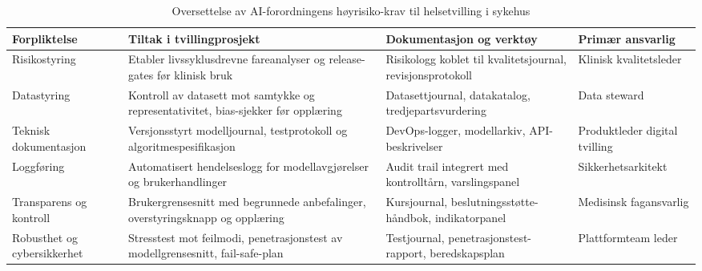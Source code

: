 \begin{table}[ht]
    \centering
    \caption{Oversettelse av AI-forordningens høyrisiko-krav til helsetvilling i sykehus}
    \label{tab:ai-helsekrav}
    \begin{tabular}{|p{3.4cm}|p{4.6cm}|p{4.6cm}|p{3.0cm}|}
        \hline
        \textbf{Forpliktelse} & \textbf{Tiltak i tvillingprosjekt} & \textbf{Dokumentasjon og verktøy} & \textbf{Primær ansvarlig} \\
        \hline
        Risikostyring & Etabler livssyklusdrevne fareanalyser og release-gates før klinisk bruk & Risikologg koblet til kvalitetsjournal, revisjonsprotokoll \citep{dnv2023digitalassurance} & Klinisk kvalitetsleder \\
        \hline
        Datastyring & Kontroll av datasett mot samtykke og representativitet, bias-sjekker før opplæring & Datasettjournal, datakatalog, tredjepartsvurdering \citep{ehelse2024tilsyn} & Data steward \\
        \hline
        Teknisk dokumentasjon & Versjonsstyrt modelljournal, testprotokoll og algoritmespesifikasjon & DevOps-logger, modellarkiv, API-beskrivelser & Produktleder digital tvilling \\
        \hline
        Loggføring & Automatisert hendelseslogg for modellavgjørelser og brukerhandlinger & Audit trail integrert med kontrolltårn, varslingspanel & Sikkerhetsarkitekt \\
        \hline
        Transparens og kontroll & Brukergrensesnitt med begrunnede anbefalinger, overstyringsknapp og opplæring & Kursjournal, beslutningsstøtte-håndbok, indikatorpanel \citep{digdir2023styringai} & Medisinsk fagansvarlig \\
        \hline
        Robusthet og cybersikkerhet & Stresstest mot feilmodi, penetrasjonstest av modellgrensesnitt, fail-safe-plan & Testjournal, penetrasjonstest-rapport, beredskapsplan & Plattformteam leder \\
        \hline
    \end{tabular}
\end{table}

